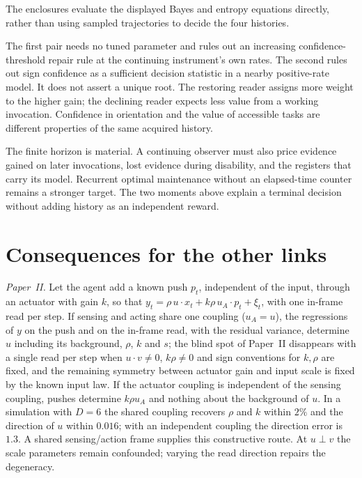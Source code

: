 \documentclass[12pt]{article}
\theoremstyle{definition}
\begin{document}
The enclosures evaluate the displayed Bayes and entropy equations directly,
rather than using sampled trajectories to decide the four histories.

The first pair needs no tuned parameter and rules out an increasing
confidence-threshold repair rule at the continuing instrument's own
rates. The second rules out sign confidence as a sufficient decision
statistic in a nearby positive-rate model. It does not assert a unique
root. The restoring reader assigns more weight to the higher gain;
the declining reader expects less value from a working invocation.
Confidence in orientation and the value of accessible tasks are
different properties of the same acquired history.

The finite horizon is material. A continuing observer must also price
evidence gained on later invocations, lost evidence during disability,
and the registers that carry its model. Recurrent optimal maintenance
without an elapsed-time counter remains a stronger target. The two
moments above explain a terminal decision without adding history
as an independent reward.

\section{Consequences for the other links}
\label{subsec:J_consequences}

\emph{Paper~II.} Let the agent add a known push $p_t$, independent of the input, through an actuator with gain $k$, so that $y_t=\rho\,u\cdot x_t+k\rho\,u_A\cdot p_t+\xi_t$, with one in-frame read per step. If sensing and acting share one coupling ($u_A=u$), the regressions of $y$ on the push and on the in-frame read, with the residual variance, determine $u$ including its background, $\rho$, $k$ and $s$; the blind spot of Paper~II disappears with a single read per step when $u\cdot v\ne0$, $k\rho\ne0$ and sign conventions for $k,\rho$ are fixed, and the remaining symmetry between actuator gain and input scale is fixed by the known input law. If the actuator coupling is independent of the sensing coupling, pushes determine $k\rho u_A$ and nothing about the background of $u$. In a simulation with $D=6$ the shared coupling recovers $\rho$ and $k$ within $2\%$ and the direction of $u$ within $0.016$; with an independent coupling the direction error is $1.3$. A shared sensing/action frame supplies this constructive route. At $u\perp v$ the scale parameters remain confounded; varying the read direction repairs the degeneracy.
\end{document}
